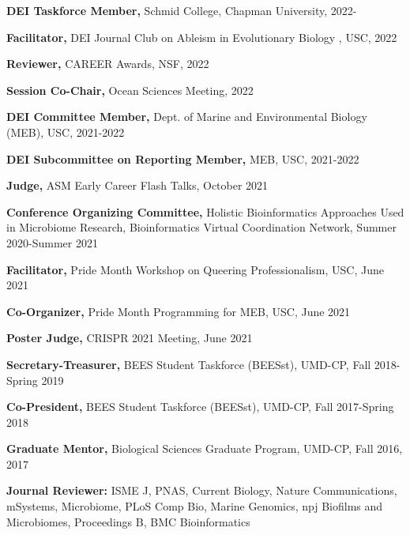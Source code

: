 \documentclass[]{res}
\begin{document}
\begin{resume}
{\bf DEI Taskforce Member,} {Schmid College}, Chapman University, 2022-

{\bf Facilitator,} DEI Journal Club on Ableism in Evolutionary Biology , USC, 2022

{\bf Reviewer,} CAREER Awards, NSF, 2022

{\bf Session Co-Chair,} {Ocean Sciences Meeting}, 2022

{\bf DEI Committee Member,} {Dept. of Marine and Environmental Biology (MEB)}, USC, 2021-2022

{\bf DEI Subcommittee on Reporting Member,} {MEB}, USC, 2021-2022

{\bf Judge,} ASM Early Career Flash Talks, October 2021

{\bf Conference Organizing Committee,} {Holistic Bioinformatics Approaches Used in Microbiome Research}, Bioinformatics Virtual Coordination Network, Summer 2020-Summer 2021

{\bf Facilitator,} {Pride Month Workshop on Queering Professionalism}, USC, June 2021

{\bf Co-Organizer,} {Pride Month Programming for MEB}, USC, June 2021


{\bf Poster Judge,} {CRISPR 2021 Meeting}, June 2021

{\bf Secretary-Treasurer,} {BEES Student Taskforce (BEESst)}, UMD-CP, Fall 2018-Spring 2019 %

{\bf Co-President,} {BEES Student Taskforce (BEESst)}, UMD-CP, Fall 2017-Spring 2018

{\bf Graduate Mentor,} {Biological Sciences Graduate Program}, UMD-CP, Fall 2016, 2017 %

{\bf Journal Reviewer:} ISME J, PNAS, Current Biology, Nature Communications, mSystems, Microbiome, PLoS Comp Bio, Marine Genomics, npj Biofilms and Microbiomes, Proceedings B, BMC Bioinformatics\\



\end{resume}
\end{document}

